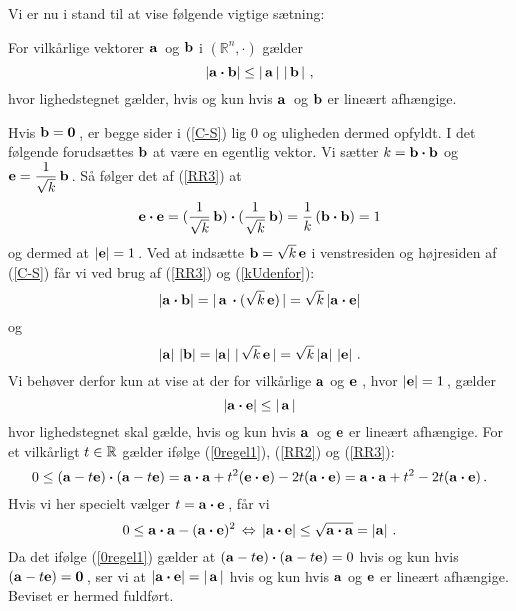 Vi er nu i stand til at vise følgende vigtige sætning:

\begin{theorem}
For vilkårlige vektorer $\mathbf{a}\,$ og $\mathbf{b}$ i $(\mathbb{R}^{n}, \bm{\cdot})$ gælder
\begin{equation}\label{C-S}
\left|\mathbf{a} \bm{\cdot} \mathbf{b}\right| \leq \left|\,\mathbf{a}\,\right|\,\left|\,\mathbf{b}\,\right|\,,
\end{equation}
hvor lighedstegnet gælder, hvis og kun hvis $\mathbf{a}\,$ og $\mathbf{b}$ er lineært afhængige.
\end{theorem}
\begin{bevis}
Hvis $\mathbf{b}=\bm{0}\,$, er begge sider i (\ref{C-S}) lig $0$ og uligheden dermed opfyldt. I det følgende forudsættes $\mathbf{b}$ at være en egentlig vektor.\bs
Vi sætter $k=\mathbf{b}\bm{\cdot}\mathbf{b}$ og $\displaystyle{\mathbf{e}=\frac{1}{\sqrt{k}}}\,\mathbf{b}\,$. Så følger det af (\ref{RR3}) at
$$\mathbf{e} \bm{\cdot}\mathbf{e}=(\frac{1}{\sqrt{k}}\,\mathbf{b})\bm{\cdot}(\frac{1}{\sqrt{k}}\,\mathbf{b})=\frac{1}{k}\,(\mathbf{b}\bm{\cdot}\mathbf{b})=1$$
og dermed at $\left|\mathbf{e}\right|=1\,$.\bs
Ved at indsætte $\mathbf{b}=\sqrt k\, \mathbf{e}$ i venstresiden og højresiden af (\ref{C-S}) får vi ved brug af (\ref{RR3}) og (\ref{kUdenfor}):
$$\left|\mathbf{a}\bm{\cdot}\mathbf{b}\right|=|\,\mathbf{a}\,\bm{\cdot}({\sqrt{k}}\,\mathbf{e})\,|=
{\sqrt{k}}\left|\mathbf{a}\bm{\cdot}\mathbf{e}\right|$$
og
$$
\left|\mathbf{a}\right|\,\left|\mathbf{b}\right|=
\left|\mathbf{a}\right|\,|\,{\sqrt{k}}\,\mathbf{e}\,|=
{\sqrt{k}}\left|\mathbf{a}\right|\,\left|\mathbf{e}\right|\,.$$
Vi behøver derfor kun at vise at der for vilkårlige $\mathbf{a}$ og $\mathbf{e}$
, hvor $\left|\mathbf{e}\right|=1\,$, gælder
\begin{equation}\label{C-S2}
\left|\mathbf{a} \bm{\cdot} \mathbf{e}\right| \leq \left|\,\mathbf{a}\,\right|
\end{equation}
hvor lighedstegnet skal gælde, hvis og kun hvis $\mathbf{a}\,$ og $\mathbf{e}$ er lineært afhængige.\bs
For et vilkårligt $t\in \mathbb{R}$ gælder ifølge (\ref{0regel1}), (\ref{RR2}) og (\ref{RR3}):
$$0\leq (\mathbf{a}-t\mathbf{e})\bm{\cdot}(\mathbf{a}-t\mathbf{e})=
\mathbf{a}\bm{\cdot}\mathbf{a}+t^2(\mathbf{e}\bm{\cdot}\mathbf{e})-2t(\mathbf{a}\bm{\cdot}\mathbf{e})
=\mathbf{a}\bm{\cdot}\mathbf{a}+t^2-2t(\mathbf{a}\bm{\cdot}\mathbf{e})\,.$$
Hvis vi her specielt vælger $t=\mathbf{a}\bm{\cdot}\mathbf{e}\,$, får vi
$$
0\leq \mathbf{a}\bm{\cdot}\mathbf{a}-(\mathbf{a}\bm{\cdot}\mathbf{e})^2
\,\Leftrightarrow\, \left|\mathbf{a}\bm{\cdot}\mathbf{e}\right|
\leq \sqrt{\mathbf{a}\bm{\cdot}\mathbf{a}}=\left|\mathbf{a}\right|\,.
$$
Da det ifølge (\ref{0regel1}) gælder at $(\mathbf{a}-t\mathbf{e})\bm{\cdot}(\mathbf{a}-t\mathbf{e})=0$ hvis og kun hvis $(\mathbf{a}-t\mathbf{e})=\bm{0}\,$, ser vi at $\left|\mathbf{a} \bm{\cdot} \mathbf{e}\right| =  \left|\,\mathbf{a}\,\right|$ hvis og kun hvis $\mathbf{a}$ og $\mathbf{e}$ er lineært afhængige. Beviset er hermed fuldført.
\end{bevis}

